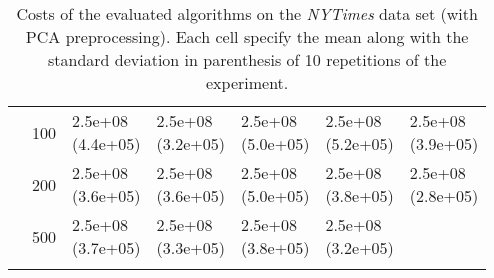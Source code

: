 \begin{longtable}{lllllll}
   & 100 &  \parbox[t]{17mm}{2.5e+08\\\small(4.4e+05)} &  \parbox[t]{17mm}{2.5e+08\\\small(3.2e+05)} &  \parbox[t]{17mm}{2.5e+08\\\small(5.0e+05)} &  \parbox[t]{17mm}{2.5e+08\\\small(5.2e+05)} &  \parbox[t]{17mm}{2.5e+08\\\small(3.9e+05)} \\
   & 200 &  \parbox[t]{17mm}{2.5e+08\\\small(3.6e+05)} &  \parbox[t]{17mm}{2.5e+08\\\small(3.6e+05)} &  \parbox[t]{17mm}{2.5e+08\\\small(5.0e+05)} &  \parbox[t]{17mm}{2.5e+08\\\small(3.8e+05)} &  \parbox[t]{17mm}{2.5e+08\\\small(2.8e+05)} \\
   & 500 &  \parbox[t]{17mm}{2.5e+08\\\small(3.7e+05)} &  \parbox[t]{17mm}{2.5e+08\\\small(3.3e+05)} &  \parbox[t]{17mm}{2.5e+08\\\small(3.8e+05)} &  \parbox[t]{17mm}{2.5e+08\\\small(3.2e+05)} &                 \\
\bottomrule
\caption{Costs of the evaluated algorithms on the \textit{NYTimes} data set (with PCA preprocessing). Each cell specify the mean along with the standard deviation in parenthesis of 10 repetitions of the experiment.}
\label{tab:real-cost-mean-std-nytimes-pca}
\end{longtable}

